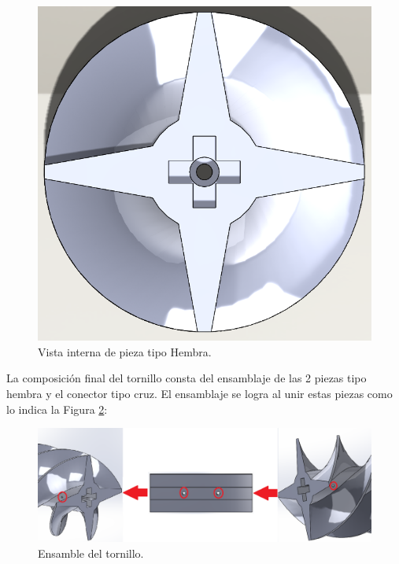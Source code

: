 \begin{figure}[H]
    \begin{center}
    	\includegraphics[scale=0.5]{img/vistainterna.png}
    \end{center}
    \caption{Vista interna de pieza tipo Hembra. \label{vistainternapng}}
\end{figure}

La composición final del tornillo consta del ensamblaje de las 2 piezas tipo hembra y el conector tipo cruz. El ensamblaje se logra al unir estas piezas como lo indica la Figura \ref{ensambletornipng}:

\begin{figure}[H]
    \begin{center}
    	\includegraphics[scale=0.35]{img/ensambletorni.png}
    \end{center}
    \caption{Ensamble del tornillo. \label{ensambletornipng}}
\end{figure}

